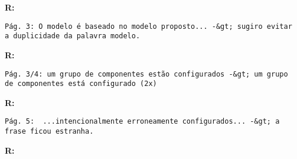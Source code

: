 {\bf R:} 

\begin{verbatim}
Pág. 3: O modelo é baseado no modelo proposto... -&gt; sugiro evitar 
a duplicidade da palavra modelo.
\end{verbatim}

{\bf R:} 

\begin{verbatim}
Pág. 3/4: um grupo de componentes estão configurados -&gt; um grupo 
de componentes está configurado (2x)
\end{verbatim}

{\bf R:} 

\begin{verbatim}
Pág. 5:  ...intencionalmente erroneamente configurados... -&gt; a 
frase ficou estranha.
\end{verbatim}

{\bf R:} 

